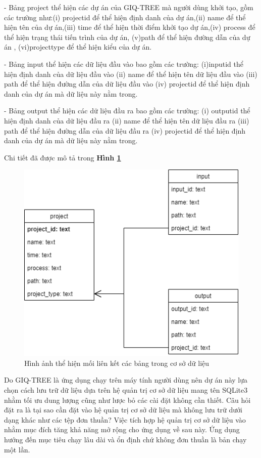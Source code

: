 \documentclass[12pt]{report}
\begin{document}
- Bảng project thể hiện các dự án của GIQ-TREE mà người dùng khởi tạo, gồm các trường như:(i) project\textunderscore id  để thể hiện định danh của dự án,(ii) name để thể hiện tên của dự án,(iii) time để thể hiện thời điểm khởi tạo dự án,(iv) process để thể hiện trạng thái tiến trình của dự án, (v)path để thể hiện đường dẫn của dự án , (vi)project\textunderscore type để thể hiện kiểu của dự án.

- Bảng input thể hiện các dữ liệu đầu vào bao gồm các trường: (i)input\textunderscore id thể hiện định danh của dữ liệu đầu vào (ii) name để thể hiện tên dữ liệu đầu vào (iii) path để thể hiện đường dẫn của dữ liệu đầu vào (iv) project\textunderscore id để thể hiện định danh của dự án mà dữ liệu này nằm trong.

- Bảng output thể hiện các dữ liệu đầu ra bao gồm các trường: (i) output\textunderscore id thể hiện định danh của dữ liệu đầu ra (ii) name để thể hiện tên dữ liệu đầu ra (iii) path để thể hiện đường dẫn của dữ liệu đầu ra (iv) project\textunderscore id để thể hiện định danh của dự án mà dữ liệu này nằm trong.

Chi tiết đã được mô tả trong \textbf{Hình \ref{fig:image4.3}}

\begin{figure}[h]
	\centering
	\includegraphics[scale=1]{Image/4.3.png}
	\caption{Hình ảnh thể hiện mối liên kết các bảng trong cơ sở dữ liệu }
	\label{fig:image4.3}
\end{figure}

Do GIQ-TREE là ứng dụng chạy trên máy tính người dùng nên dự án này lựa chọn cách lưu trữ dữ liệu dựa trên hệ quản trị cơ sở dữ liệu mang tên SQLite3 nhằm tối ưu dung lượng cũng như lược bỏ các cài đặt không cần thiết. Câu hỏi đặt ra là tại sao cần đặt vào hệ quản trị cơ sở dữ liệu mà không lưu trữ dưới dạng khác như các tệp đơn thuần? Việc tích hợp hệ quản trị cơ sở dữ liệu vào nhằm mục đích tăng khả năng mở rộng cho ứng dụng về sau này. Ứng dụng hướng đến mục tiêu chạy lâu dài và ổn định chứ không đơn thuần là bản chạy một lần.
\end{document}
